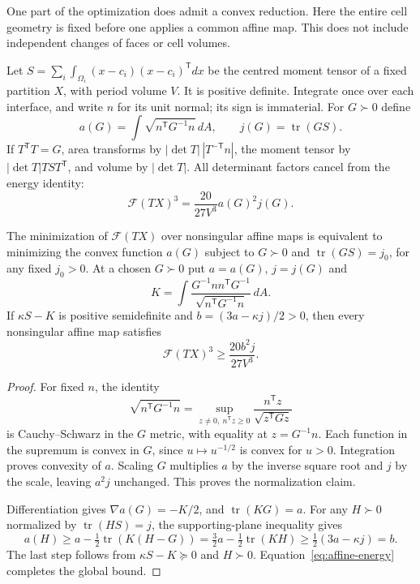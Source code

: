 \documentclass[11pt,a4paper]{report}
\newcommand{\DF}{\mathcal F}
\begin{document}
One part of the optimization does admit a convex reduction. Here the
entire cell geometry is fixed before one applies a common affine map.
This does not include independent changes of faces or cell volumes.

Let $S=\sum_i\int_{\Omega_i}(x-c_i)(x-c_i)^{\mathsf T}dx$ be the
centred moment tensor of a fixed partition $X$, with period volume $V$.
It is positive definite. Integrate once over each interface, and write
$n$ for its unit normal; its sign is immaterial. For $G\succ0$ define
\[
 a(G)=\int\sqrt{n^{\mathsf T}G^{-1}n}\,dA,
 \qquad j(G)=\operatorname{tr}(GS).
\]
If $T^{\mathsf T}T=G$, area transforms by
$|\det T|\,|T^{-\mathsf T}n|$, the moment tensor by
$|\det T|TST^{\mathsf T}$, and volume by $|\det T|$.
All determinant factors cancel from the energy identity:
\begin{equation}\label{eq:affine-energy}
 \DF(TX)^3=\frac{20}{27V^3}a(G)^2j(G).
\end{equation}

\begin{theorem}\label{thm:affine}
The minimization of $\DF(TX)$ over nonsingular affine maps is equivalent
to minimizing the convex function $a(G)$ subject to
$G\succ0$ and $\operatorname{tr}(GS)=j_0$, for any fixed $j_0>0$.
At a chosen $G\succ0$ put $a=a(G)$, $j=j(G)$ and
\[
 K=\int\frac{G^{-1}nn^{\mathsf T}G^{-1}}
                   {\sqrt{n^{\mathsf T}G^{-1}n}}\,dA.
\]
If $\kappa S-K$ is positive semidefinite and $b=(3a-\kappa j)/2>0$,
then every nonsingular affine map satisfies
\begin{equation}\label{eq:affine-lower}
 \DF(TX)^3\geq\frac{20b^2j}{27V^3}.
\end{equation}
\end{theorem}
\begin{proof}
For fixed $n$, the identity
\[
 \sqrt{n^{\mathsf T}G^{-1}n}
 =\sup_{z\ne0,\ n^{\mathsf T}z\geq0}
       \frac{n^{\mathsf T}z}{\sqrt{z^{\mathsf T}Gz}}
\]
is Cauchy--Schwarz in the $G$ metric, with equality at $z=G^{-1}n$.
Each function in the supremum is convex in $G$, since $u\mapsto u^{-1/2}$
is convex for $u>0$. Integration proves convexity of $a$.
Scaling $G$ multiplies $a$ by the inverse square root and $j$ by the
scale, leaving $a^2j$ unchanged. This proves the normalization claim.

Differentiation gives $\nabla a(G)=-K/2$, and
$\operatorname{tr}(KG)=a$. For any $H\succ0$ normalized by
$\operatorname{tr}(HS)=j$, the supporting-plane inequality gives
\[
 a(H)\geq a-\tfrac12\operatorname{tr}(K(H-G))
 =\tfrac32a-\tfrac12\operatorname{tr}(KH)
 \geq\tfrac12(3a-\kappa j)=b.
\]
The last step follows from $\kappa S-K\succeq0$ and $H\succ0$.
Equation~\eqref{eq:affine-energy} completes the global bound.
\end{proof}
\end{document}

